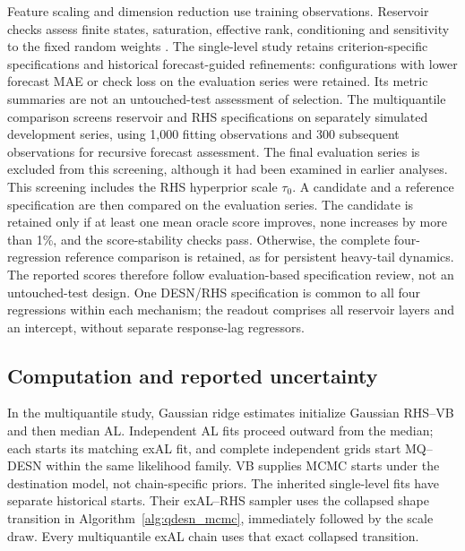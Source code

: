 \documentclass[12pt,letterpaper]{article}
\numberwithin{suppalgorithm}{section}
\numberwithin{equation}{section}
\numberwithin{table}{section}
\numberwithin{figure}{section}
\begin{document}
Feature scaling and dimension reduction use training observations.
Reservoir checks assess finite states, saturation, effective rank,
conditioning and sensitivity to the fixed random weights
\citep{JaegerLukoseviciusPopoviciSiewert2007LeakyESN,YildizJaegerKiebel2012ESP}.
The single-level study retains criterion-specific specifications and
historical forecast-guided refinements: configurations with lower forecast
MAE or check loss on the evaluation series were retained. Its metric
summaries are not an untouched-test assessment of selection.
The multiquantile comparison screens reservoir and RHS specifications on
separately simulated development series, using 1,000 fitting observations
and 300 subsequent observations for recursive forecast assessment. The
final evaluation series is excluded from this screening, although it
had been examined in earlier analyses. This screening includes the RHS
hyperprior scale \(\tau_0\). A candidate and a reference specification
are then compared on the evaluation series. The candidate is retained only
if at least one mean oracle score improves, none increases by more than
1\%, and the score-stability checks pass. Otherwise, the complete
four-regression reference comparison is retained, as for persistent
heavy-tail dynamics. The reported scores therefore follow evaluation-based
specification review, not an untouched-test design. One DESN/RHS specification is common to all
four regressions within each mechanism; the readout comprises all reservoir
layers and an intercept, without separate response-lag regressors.

\subsection{Computation and reported uncertainty}
\label{subsec:supp-independent-metrics}
\label{subsec:supp-independent-exal-mcmc-details}
\label{subsec:supp-mq-computation}

In the multiquantile study, Gaussian ridge estimates initialize Gaussian
RHS--VB and then median AL. Independent AL fits proceed outward from the
median; each starts its matching exAL fit, and complete independent grids
start MQ--DESN within the same likelihood family. VB supplies MCMC starts
under the destination model, not chain-specific priors. The inherited
single-level fits have separate historical starts. Their exAL--RHS sampler
uses the collapsed shape transition in Algorithm~\ref{alg:qdesn_mcmc},
immediately followed by the scale draw. Every multiquantile exAL chain uses
that exact collapsed transition.
\end{document}
